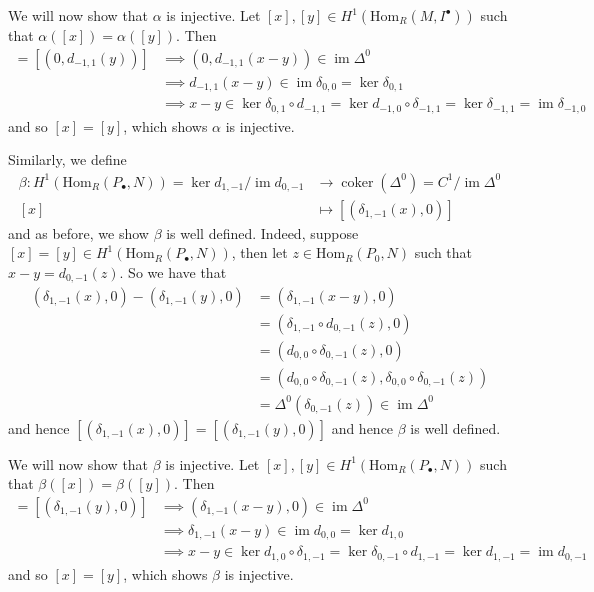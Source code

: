 \documentclass{article}
\newcommand{\Hom}[2]{\mathrm{Hom}_R(#1, #2)}
\DeclareMathOperator{\im}{im}
\DeclareMathOperator{\coker}{coker}
\begin{document}
We will now show that $\alpha$ is injective. Let $[x], [y]
\in H^1(\Hom{M}{I^\bullet})$ such that
$\alpha([x]) = \alpha([y])$. Then
\begin{align*}
	[(0, d_{-1, 1}(x))] = [(0, d_{-1, 1}(y))]
	&\implies (0, d_{-1, 1}(x - y)) \in \im \Delta^0\\
	&\implies d_{-1, 1}(x - y) \in \im \delta_{0, 0}
	= \ker \delta_{0, 1}\\
	&\implies x - y \in \ker \delta_{0, 1} \circ d_{-1, 1}
	= \ker d_{-1, 0} \circ \delta_{-1, 1} 
	= \ker \delta_{-1, 1} = \im \delta_{-1, 0}
\end{align*}
and so $[x] = [y]$, which shows $\alpha$ is injective.

Similarly, we define
\begin{align*}
	\beta: H^1(\Hom{P_\bullet}{N}) =
	\ker d_{1, -1}/\im d_{0,-1} &\to \coker(\Delta^0)
	= C^1/\im \Delta^0\\
	[x] &\mapsto [(\delta_{1, -1}(x), 0)]
\end{align*}
and as before, we show $\beta$ is well defined. Indeed, suppose 
$[x] = [y] \in H^1(\Hom{P_\bullet}{N})$, then
let $z \in \Hom{P_0}{N}$ such that $x - y = d_{0, -1}(z)$.
So we have that
\begin{align*}
	(\delta_{1, -1}(x), 0) - (\delta_{1, -1}(y), 0) &= 
	(\delta_{1, -1}(x - y), 0)\\
	&= (\delta_{1, -1}\circ d_{0, -1}(z), 0)\\
	&= (d_{0, 0}\circ \delta_{0, -1}(z), 0)\\
	&= (d_{0, 0}\circ \delta_{0, -1}(z),
	\delta_{0, 0}\circ \delta_{0, -1}(z))\\
	&= \Delta^0(\delta_{0, -1}(z)) \in \im \Delta^0
\end{align*}
and hence $[(\delta_{1, -1}(x), 0)] = [(\delta_{1, -1}(y), 0)]$
and hence
$\beta$ is well defined.

We will now show that $\beta$ is injective. Let $[x], [y]
\in H^1(\Hom{P_\bullet}{N})$ such that
$\beta([x]) = \beta([y])$. Then
\begin{align*}
	[(\delta_{1, -1}(x), 0)] = [(\delta_{1, -1}(y), 0)]
	&\implies (\delta_{1, -1}(x - y), 0) \in \im \Delta^0\\
	&\implies \delta_{1, -1}(x - y) \in \im d_{0, 0}
	= \ker d_{1, 0}\\
	&\implies x - y \in \ker d_{1, 0} \circ \delta_{1, -1}
	= \ker \delta_{0, -1} \circ d_{1, -1} 
	= \ker d_{1, -1} = \im d_{0, -1}
\end{align*}
and so $[x] = [y]$, which shows $\beta$ is injective.
\end{document}
